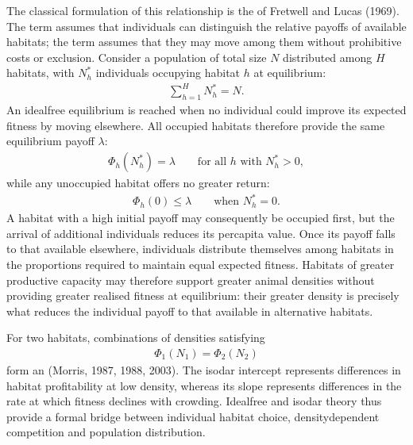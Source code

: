 \documentclass[letterpaper,10pt,english]{sphinxmanual}
\begin{document}
\sphinxAtStartPar
The classical formulation of this relationship is the  of Fretwell and Lucas (1969). The term  assumes that individuals can distinguish the relative payoffs of available habitats; the term  assumes that they may move among them without prohibitive costs or exclusion. Consider a population of total size \(N\) distributed among \(H\) habitats, with \(N_h^{*}\) individuals occupying habitat \(h\) at equilibrium:
\begin{equation*}
\begin{split}
\sum_{h=1}^{H} N_h^{*} = N.
\end{split}
\end{equation*}
\sphinxAtStartPar
An ideal\sphinxhyphen{}free equilibrium is reached when no individual could improve its expected fitness by moving elsewhere. All occupied habitats therefore provide the same equilibrium payoff \(\lambda\):
\begin{equation*}
\begin{split}
\Phi_h\left(N_h^{*}\right)
=
\lambda
\qquad
\text{for all } h \text{ with } N_h^{*}>0,
\end{split}
\end{equation*}
\sphinxAtStartPar
while any unoccupied habitat offers no greater return:
\begin{equation*}
\begin{split}
\Phi_h(0)
\leq
\lambda
\qquad
\text{when } N_h^{*}=0.
\end{split}
\end{equation*}
\sphinxAtStartPar
A habitat with a high initial payoff may consequently be occupied first, but the arrival of additional individuals reduces its per\sphinxhyphen{}capita value. Once its payoff falls to that available elsewhere, individuals distribute themselves among habitats in the proportions required to maintain equal expected fitness. Habitats of greater productive capacity may therefore support greater animal densities without providing greater realised fitness at equilibrium: their greater density is precisely what reduces the individual payoff to that available in alternative habitats.

\sphinxAtStartPar
For two habitats, combinations of densities satisfying
\begin{equation*}
\begin{split}
\Phi_1(N_1)=\Phi_2(N_2)
\end{split}
\end{equation*}
\sphinxAtStartPar
form an  (Morris, 1987, 1988, 2003). The isodar intercept represents differences in habitat profitability at low density, whereas its slope represents differences in the rate at which fitness declines with crowding. Ideal\sphinxhyphen{}free and isodar theory thus provide a formal bridge between individual habitat choice, density\sphinxhyphen{}dependent competition and population distribution.
\end{document}

